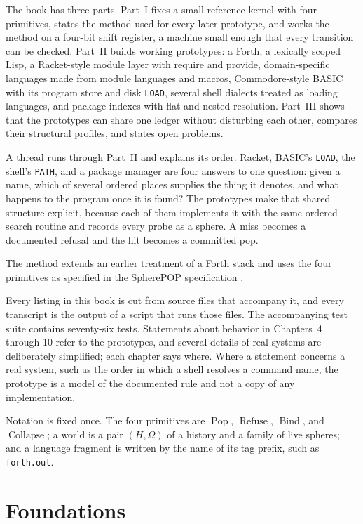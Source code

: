 \documentclass[11pt,oneside]{report}
\newcommand{\SP}{SpherePOP}
\newcommand{\Pop}{\operatorname{Pop}}
\newcommand{\Refuse}{\operatorname{Refuse}}
\newcommand{\Bind}{\operatorname{Bind}}
\newcommand{\Collapse}{\operatorname{Collapse}}
\theoremstyle{plain}
\theoremstyle{definition}
\theoremstyle{remark}
\begin{document}
The book has three parts. Part~I fixes a small reference kernel with four primitives, states the method used for every later prototype, and works the method on a four-bit shift register, a machine small enough that every transition can be checked. Part~II builds working prototypes: a Forth, a lexically scoped Lisp, a Racket-style module layer with require and provide, domain-specific languages made from module languages and macros, Commodore-style BASIC with its program store and disk \texttt{LOAD}, several shell dialects treated as loading languages, and package indexes with flat and nested resolution. Part~III shows that the prototypes can share one ledger without disturbing each other, compares their structural profiles, and states open problems.

A thread runs through Part~II and explains its order. Racket, BASIC's \texttt{LOAD}, the shell's \texttt{PATH}, and a package manager are four answers to one question: given a name, which of several ordered places supplies the thing it denotes, and what happens to the program once it is found? The prototypes make that shared structure explicit, because each of them implements it with the same ordered-search routine and records every probe as a sphere. A miss becomes a documented refusal and the hit becomes a committed pop.

The method extends an earlier treatment of a Forth stack \cite{flyxion-forth} and uses the four primitives as specified in the \SP{} specification \cite{flyxion-spec}.

Every listing in this book is cut from source files that accompany it, and every transcript is the output of a script that runs those files. The accompanying test suite contains seventy-six tests. Statements about behavior in Chapters~4 through 10 refer to the prototypes, and several details of real systems are deliberately simplified; each chapter says where. Where a statement concerns a real system, such as the order in which a shell resolves a command name, the prototype is a model of the documented rule and not a copy of any implementation.

Notation is fixed once. The four primitives are $\Pop$, $\Refuse$, $\Bind$, and $\Collapse$; a world is a pair $(H,\Omega)$ of a history and a family of live spheres; and a language fragment is written by the name of its tag prefix, such as \texttt{forth.out}.
\part{Foundations}
\end{document}
